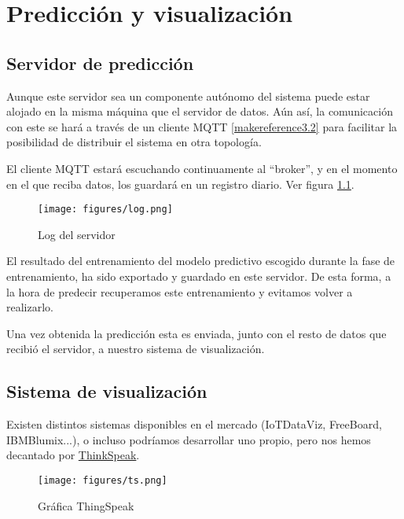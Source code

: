 \cleardoublepage

\chapter{Predicción y visualización}
\label{makereference5}

\section{Servidor de predicción}

Aunque este servidor sea un componente autónomo del sistema puede estar alojado en la misma máquina que el servidor de datos. Aún así, la comunicación con este se hará a través de un cliente MQTT \ref{makereference3.2} para facilitar la posibilidad de distribuir el sistema en otra topología.

El cliente MQTT estará escuchando continuamente al ``broker'', y en el momento en el que reciba datos, los guardará en un registro diario. Ver figura \ref{log}.

	\begin{figure}[htb]
		\begin{center}
			\texttt{[image: figures/log.png]}
			\caption{Log del servidor \label{log}}
		\end{center}
	\end{figure}

El resultado del entrenamiento del modelo predictivo escogido durante la fase de entrenamiento, ha sido exportado y guardado en este servidor. De esta forma, a la hora de predecir recuperamos este entrenamiento y evitamos volver a realizarlo.

Una vez obtenida la predicción esta es enviada, junto con el resto de datos que recibió el servidor, a nuestro sistema de visualización. 

\section{Sistema de visualización}

Existen distintos sistemas disponibles en el mercado (IoTDataViz, FreeBoard, IBMBlumix...), o incluso podríamos desarrollar uno propio, pero nos hemos decantado por \href{https://thingspeak.com/}{ThinkSpeak}.

\begin{figure}[htb]
	\begin{center}
		\texttt{[image: figures/ts.png]}
		\caption{Gráfica ThingSpeak \label{ts}}
	\end{center}
\end{figure}

